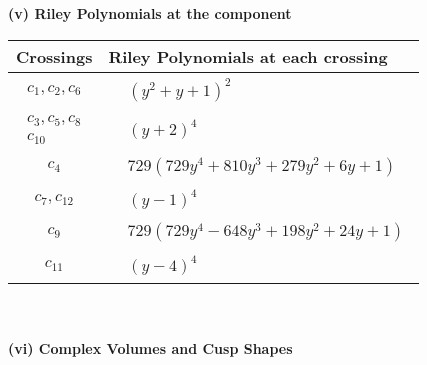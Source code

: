 \documentclass[1p]{elsarticle_modified}
\theoremstyle{definition}
\begin{document}
\newpage\renewcommand{\arraystretch}{1}
\flushleft \textbf{(v) Riley Polynomials at the component}\newline \\
\begin{tabular}{m{50pt}|m{274pt}}
Crossings & \hspace{64pt}Riley Polynomials at each crossing \\
\hline $$\begin{aligned}c_{1},c_{2},c_{6}\end{aligned}$$&$\begin{aligned}
&(y^2+y+1)^2
\end{aligned}$\\
\hline $$\begin{aligned}c_{3},c_{5},c_{8}\\c_{10}\end{aligned}$$&$\begin{aligned}
&(y+2)^4
\end{aligned}$\\
\hline $$\begin{aligned}c_{4}\end{aligned}$$&$\begin{aligned}
&729(729 y^4+810 y^3+279 y^2+6 y+1)
\end{aligned}$\\
\hline $$\begin{aligned}c_{7},c_{12}\end{aligned}$$&$\begin{aligned}
&(y-1)^4
\end{aligned}$\\
\hline $$\begin{aligned}c_{9}\end{aligned}$$&$\begin{aligned}
&729(729 y^4-648 y^3+198 y^2+24 y+1)
\end{aligned}$\\
\hline $$\begin{aligned}c_{11}\end{aligned}$$&$\begin{aligned}
&(y-4)^4
\end{aligned}$\\
\hline
\end{tabular}\\~\\
\newpage\flushleft \textbf{(vi) Complex Volumes and Cusp Shapes}
\end{document}
